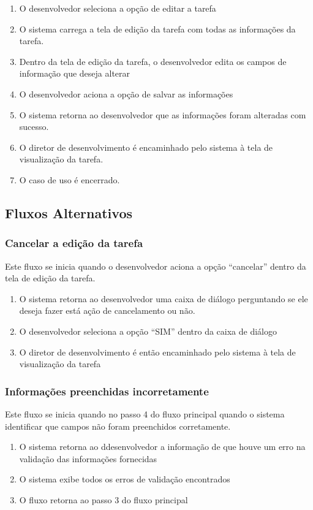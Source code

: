 \begin{enumerate}
  \item O desenvolvedor seleciona a opção de editar a tarefa
  \item O sistema carrega a tela de edição da tarefa com todas as informações da tarefa.
  \item Dentro da tela de edição da tarefa, o desenvolvedor edita os campos de informação que deseja alterar
  \item O desenvolvedor aciona a opção de salvar as informações
  \item O sistema retorna ao desenvolvedor que as informações foram alteradas com sucesso.
  \item O diretor de desenvolvimento é encaminhado pelo sistema à tela de visualização da tarefa.
  \item O caso de uso é encerrado.
\end{enumerate}

\subsection{Fluxos Alternativos}

\subsubsection{Cancelar a edição da tarefa}
Este fluxo se inicia quando o desenvolvedor aciona a opção “cancelar” dentro da tela de edição da tarefa.

\begin{enumerate}
  \item O sistema retorna ao desenvolvedor uma caixa de diálogo perguntando se ele deseja fazer está ação de cancelamento ou não.
  \item O desenvolvedor seleciona a opção “SIM” dentro da caixa de diálogo
  \item O diretor de desenvolvimento é então encaminhado pelo sistema à tela de visualização da tarefa
\end{enumerate}

\subsubsection{Informações preenchidas incorretamente}
Este fluxo se inicia quando no passo 4 do fluxo principal quando o sistema identificar que campos não foram preenchidos corretamente.

\begin{enumerate}
  \item O sistema retorna ao ddesenvolvedor a informação de que houve um erro na validação das informações fornecidas
  \item O sistema exibe todos os erros de validação encontrados
  \item O fluxo retorna ao passo 3 do fluxo principal
\end{enumerate}


